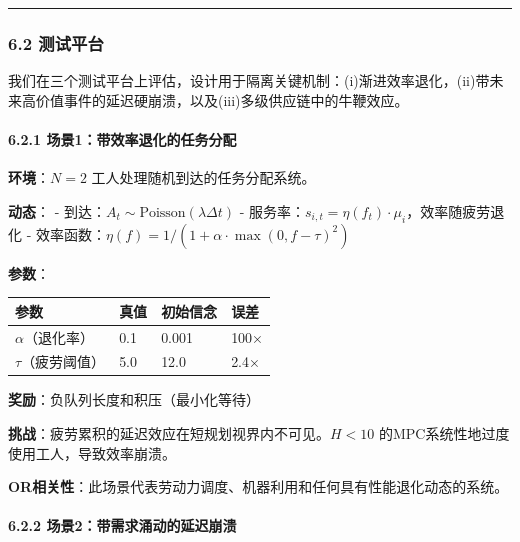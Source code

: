 \documentclass[UTF8]{ctexart}
\let\oldparagraph\paragraph
\renewcommand{\paragraph}[1]{\oldparagraph{#1}\mbox{}}
\begin{document}
\begin{center}\rule{0.5\linewidth}{0.4pt}\end{center}

\hypertarget{ux6d4bux8bd5ux5e73ux53f0}{%
\subsubsection{6.2 测试平台}\label{ux6d4bux8bd5ux5e73ux53f0}}

我们在三个测试平台上评估，设计用于隔离关键机制：(i)渐进效率退化，(ii)带未来高价值事件的延迟硬崩溃，以及(iii)多级供应链中的牛鞭效应。

\hypertarget{ux573aux666f1ux5e26ux6548ux7387ux9000ux5316ux7684ux4efbux52a1ux5206ux914d}{%
\paragraph{6.2.1
场景1：带效率退化的任务分配}\label{ux573aux666f1ux5e26ux6548ux7387ux9000ux5316ux7684ux4efbux52a1ux5206ux914d}}

\textbf{环境}：\(N=2\) 工人处理随机到达的任务分配系统。

\textbf{动态}： - 到达：\(A_t \sim \text{Poisson}(\lambda \Delta t)\) -
服务率：\(s_{i,t} = \eta(f_t) \cdot \mu_i\)，效率随疲劳退化 -
效率函数：\(\eta(f) = 1/(1 + \alpha \cdot \max(0, f-\tau)^2)\)

\textbf{参数}：

\begin{table}[h]
\centering
\begin{tabular}{p{3cm}p{3cm}p{5cm}p{3cm}}
\toprule
\textbf{参数} & \textbf{真值} & \textbf{初始信念} & \textbf{误差} \\
\midrule
\(\alpha\)（退化率） & 0.1 & 0.001 & 100× \\
\(\tau\)（疲劳阈值） & 5.0 & 12.0 & 2.4× \\
\bottomrule
\end{tabular}
\end{table}

\textbf{奖励}：负队列长度和积压（最小化等待）

\textbf{挑战}：疲劳累积的延迟效应在短规划视界内不可见。\(H < 10\)
的MPC系统性地过度使用工人，导致效率崩溃。

\textbf{OR相关性}：此场景代表劳动力调度、机器利用和任何具有性能退化动态的系统。

\hypertarget{ux573aux666f2ux5e26ux9700ux6c42ux6d8cux52a8ux7684ux5ef6ux8fdfux5d29ux6e83}{%
\paragraph{6.2.2
场景2：带需求涌动的延迟崩溃}\label{ux573aux666f2ux5e26ux9700ux6c42ux6d8cux52a8ux7684ux5ef6ux8fdfux5d29ux6e83}}
\end{document}
